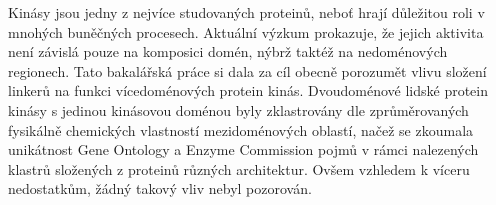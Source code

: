\documentclass[12pt]{report}
\begin{document}
\ifEN
Kinásy jsou jedny z nejvíce studovaných proteinů, neboť hrají důležitou roli v mnohých
buněčných procesech.
Aktuální výzkum prokazuje, že jejich aktivita není závislá pouze na komposici domén, nýbrž
taktéž na nedoménových regionech.
Tato bakalářská práce si dala za cíl obecně porozumět vlivu složení linkerů na funkci
vícedoménových protein kinás.
Dvoudoménové lidské protein kinásy s jedinou kinásovou doménou byly zklastrovány dle
zprůměrovaných fysikálně chemických vlastností mezidoménových oblastí, načež se
zkoumala unikátnost Gene Ontology a Enzyme Commission pojmů v rámci nalezených klastrů
složených z proteinů různých architektur.
Ovšem vzhledem k víceru nedostatkům, žádný takový vliv nebyl pozorován.
\else\Abstract\fi
\end{document}
